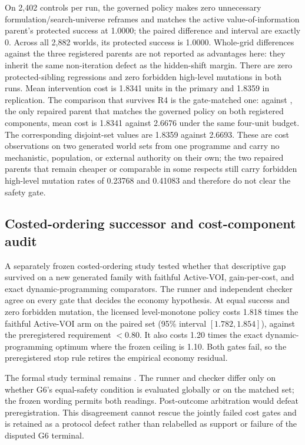 On 2,402 controls per run, the governed policy makes zero unnecessary
formulation/search-universe reframes and matches the active
value-of-information parent's protected success at 1.0000; the paired difference
and interval are exactly 0. Across all 2,882 worlds, its protected success is
1.0000. Whole-grid differences against the three registered parents are not
reported as advantages here: they inherit the same non-iteration defect as the
hidden-shift margin. There are zero protected-sibling regressions and zero
forbidden high-level mutations in both runs. Mean intervention cost is 1.8341
units in the primary and 1.8359 in replication. The comparison that survives R4
is the gate-matched one: against , the
only repaired parent that matches the governed policy on both registered
components, mean cost is 1.8341 against 2.6676 under the same four-unit budget.
The corresponding disjoint-set values are 1.8359 against 2.6693. These are cost
observations on two generated world sets from one programme and carry no
mechanistic, population, or external authority on their own; the two repaired parents that remain cheaper or comparable
in some respects still carry forbidden high-level mutation rates of 0.23768 and
0.41083 and therefore do not clear the safety gate.

\subsection{Costed-ordering successor and cost-component audit}

A separately frozen costed-ordering study tested whether that descriptive gap
survived on a new generated family with faithful Active-VOI, gain-per-cost, and
exact dynamic-programming comparators. The runner and independent checker agree
on every gate that decides the economy hypothesis. At equal success and zero
forbidden mutation, the licensed level-monotone policy costs 1.818 times the
faithful Active-VOI arm on the paired set (95\% interval
$[1.782,1.854]$), against the preregistered requirement $<0.80$. It also costs
1.20 times the exact dynamic-programming optimum where the frozen ceiling is
1.10. Both gates fail, so the preregistered stop rule retires the empirical
economy residual.

The formal study terminal remains
. The runner and checker differ only on
whether G6's equal-safety condition is evaluated globally or on the matched
set; the frozen wording permits both readings. Post-outcome arbitration would
defeat preregistration. This disagreement cannot rescue the jointly failed cost
gates and is retained as a protocol defect rather than relabelled as support or
failure of the disputed G6 terminal.

